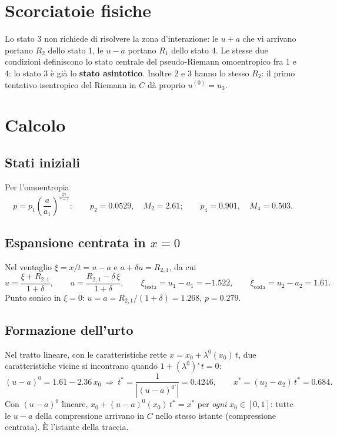 \documentclass[11pt,a4paper]{article}
\newcommand{\uma}{u-a}
\newcommand{\upa}{u+a}
\begin{document}
\section{Scorciatoie fisiche}
Lo stato 3 non richiede di risolvere la zona d'interazione: le $\upa$ che vi arrivano portano $R_2$ dello stato 1,
le $\uma$ portano $R_1$ dello stato 4. Le stesse due condizioni definiscono lo stato centrale del
pseudo-Riemann omoentropico fra 1 e 4: lo stato 3 è già lo \textbf{stato asintotico}. Inoltre 2 e 3 hanno lo
stesso $R_2$: il primo tentativo isentropico del Riemann in $C$ dà proprio $u^{(0)}=u_3$.

\section{Calcolo}

\subsection*{Stati iniziali}
Per l'omoentropia
\[
p=p_1\left(\frac{a}{a_1}\right)^{\frac{2\gamma}{\gamma-1}}:\qquad
p_2=\num{0.0529},\quad M_2=\num{2.61};\qquad p_4=\num{0.901},\quad M_4=\num{0.503}.
\]

\subsection*{Espansione centrata in $x=0$}
Nel ventaglio $\xi=x/t=u-a$ e $a+\delta u=R_{2,1}$, da cui
\[
u=\frac{\xi+R_{2,1}}{1+\delta},\qquad a=\frac{R_{2,1}-\delta\,\xi}{1+\delta},\qquad
\xi_{\text{testa}}=u_1-a_1=-\num{1.522},\qquad \xi_{\text{coda}}=u_2-a_2=\num{1.61}.
\]
Punto sonico in $\xi=0$: $u=a=R_{2,1}/(1+\delta)=\num{1.268}$, $p=\num{0.279}$.

\subsection*{Formazione dell'urto}
Nel tratto lineare, con le caratteristiche rette $x=x_0+\lambda^0(x_0)\,t$, due caratteristiche vicine si
incontrano quando $1+(\lambda^0)'\,t=0$:
\[
(u-a)^0=\num{1.61}-\num{2.36}\,x_0\ \Rightarrow\ t^*=\frac{1}{|(u-a)^{0\prime}|}=\num{0.4246},\qquad
x^*=(u_2-a_2)\,t^*=\num{0.684}.
\]
Con $(u-a)^0$ lineare, $x_0+(u-a)^0(x_0)\,t^*=x^*$ per \emph{ogni} $x_0\in[0,1]$: tutte le $\uma$ della
compressione arrivano in $C$ nello stesso istante (compressione centrata). È l'istante della traccia.
\end{document}
